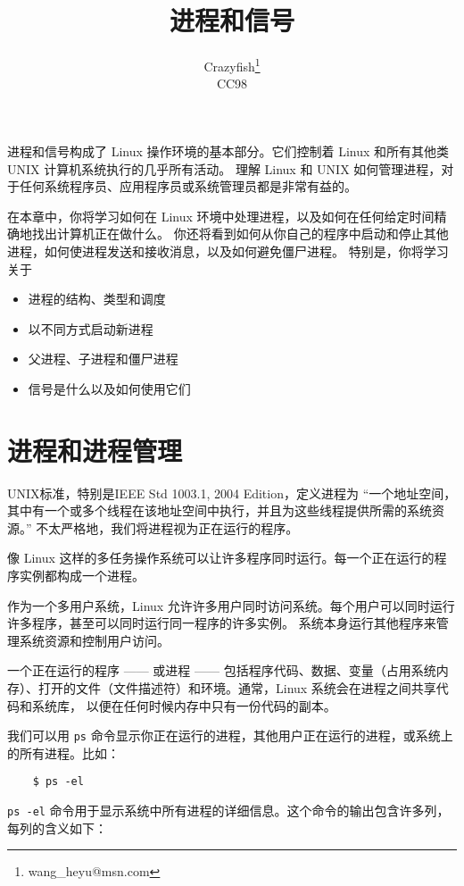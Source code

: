 \documentclass{ctexart}
\title{进程和信号}
\author{Crazyfish\footnote{wang\_heyu@msn.com} \\ CC98}
\date{}
\begin{document}
\maketitle


进程和信号构成了 Linux 操作环境的基本部分。它们控制着 Linux 和所有其他类 UNIX 计算机系统执行的几乎所有活动。
理解 Linux 和 UNIX 如何管理进程，对于任何系统程序员、应用程序员或系统管理员都是非常有益的。

在本章中，你将学习如何在 Linux 环境中处理进程，以及如何在任何给定时间精确地找出计算机正在做什么。
你还将看到如何从你自己的程序中启动和停止其他进程，如何使进程发送和接收消息，以及如何避免僵尸进程。
特别是，你将学习关于
\begin{itemize}
    \item 进程的结构、类型和调度
    \item 以不同方式启动新进程
    \item 父进程、子进程和僵尸进程
    \item 信号是什么以及如何使用它们
\end{itemize}

\section{进程和进程管理}
UNIX标准，特别是IEEE Std 1003.1, 2004 Edition，定义进程为 ``一个地址空间，其中有一个或多个线程在该地址空间中执行，并且为这些线程提供所需的系统资源。'' 
不太严格地，我们将进程视为正在运行的程序。

像 Linux 这样的多任务操作系统可以让许多程序同时运行。每一个正在运行的程序实例都构成一个进程。

作为一个多用户系统，Linux 允许许多用户同时访问系统。每个用户可以同时运行许多程序，甚至可以同时运行同一程序的许多实例。
系统本身运行其他程序来管理系统资源和控制用户访问。

一个正在运行的程序 —— 或进程 —— 包括程序代码、数据、变量（占用系统内存）、打开的文件（文件描述符）和环境。通常，Linux 系统会在进程之间共享代码和系统库，
以便在任何时候内存中只有一份代码的副本。

我们可以用 \verb|ps| 命令显示你正在运行的进程，其他用户正在运行的进程，或系统上的所有进程。比如：
\begin{verbatim}
    $ ps -el
\end{verbatim}

\texttt{ps -el} 命令用于显示系统中所有进程的详细信息。这个命令的输出包含许多列，每列的含义如下：  
  
\end{document}
